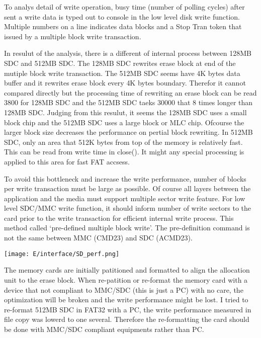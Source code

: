 
To analys detail of write operation, busy time (number of polling cycles) after
sent a write data is typed out to console in the low level disk write function.
Multiple numbers on a line indicates data blocks and a Stop Tran token that
issued by a multiple block write transaction.

In resulut of the analysis, there is a different of internal process between
128MB SDC and 512MB SDC. The 128MB SDC rewrites erase block at end of the
mutiple block write transaction. The 512MB SDC seems have 4K bytes data buffer
and it rewrites erase block every 4K bytes boundary. Therefor it cannot compared
directly but the processing time of rewriting an erase block can be read 3800
for 128MB SDC and the 512MB SDC taeks 30000 that 8 times longer than 128MB SDC.
Judging from this resulut, it seems the 128MB SDC uses a small block chip and
the 512MB SDC uses a large block or MLC chip. Ofcourse the larger block size
decreases the performance on pertial block rewriting. In 512MB SDC, only an area
that 512K bytes from top of the memory is relatively fast. This can be read from
write time in close(). It might any special processing is applied to this area
for fast FAT accsess.


To avoid this bottleneck and increase the write performance, number of blocks
per write transaction must be large as possible. Of course all layers between
the application and the media must support multiple sector write feature. For
low level SDC/MMC write function, it should inform number of write sectors to
the card prior to the write transaction for efficient internal write process.
This method called `pre-defined multiple block write'. The pre-definition
command is not the same between MMC (CMD23) and SDC (ACMD23).

\bigskip
\noindent\texttt{[image: E/interface/SD\_perf.png]}
\bigskip

The memory cards are initially patitioned and formatted to align the allocation
unit to the erase block. When re-patition or re-format the memory card with a
device that not compliant to MMC/SDC (this is just a PC) with no care, the
optimization will be broken and the write performance might be lost. I tried to
re-format 512MB SDC in FAT32 with a PC, the write performance measured in file
copy was lowerd to one several. Therefore the re-formatting the card should be
done with MMC/SDC compliant equipments rather than PC.

\secup

\secup
